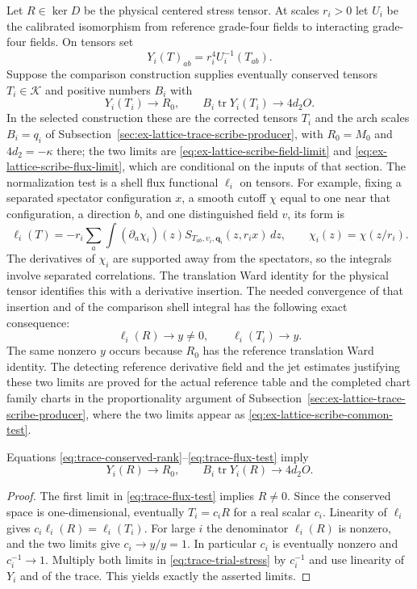 Let $R\in\ker D$ be the physical centered stress tensor. At scales
$r_i>0$ let $U_i$ be the calibrated isomorphism from reference grade-four
fields to interacting grade-four fields. On tensors set
\[
 Y_i(T)_{ab}=r_i^4U_i^{-1}(T_{ab}).
\]
Suppose the comparison construction supplies eventually conserved tensors
$T_i\in\mathcal K$ and positive numbers $B_i$ with
\begin{equation}\label{eq:trace-trial-stress}
 Y_i(T_i)\longrightarrow R_0,\qquad
 B_i\operatorname{tr}Y_i(T_i)\longrightarrow4d_2O.
\end{equation}
In the selected construction these are the corrected tensors $T_i$ and
the arch scales $B_i=q_i$ of
Subsection~\ref{sec:ex-lattice-trace-scribe-producer}, with $R_0=M_0$ and
$4d_2=-\kappa$ there; the two limits are
\eqref{eq:ex-lattice-scribe-field-limit} and
\eqref{eq:ex-lattice-scribe-flux-limit}, which are conditional on the
inputs of that section.
The normalization test is a shell flux functional $\ell_i$ on tensors.
For example, fixing a separated spectator configuration $x$, a smooth
cutoff $\chi$ equal to one near that configuration, a direction $b$, and
one distinguished field $v$, its form is
\[
 \ell_i(T)=-r_i\sum_a\int(\partial_a\chi_i)(z)
   S_{T_{ab},v_i,\boldsymbol q_i}(z,r_ix)\,dz,
 \qquad \chi_i(z)=\chi(z/r_i).
\]
The derivatives of $\chi_i$ are supported away from the spectators, so the
integrals involve separated correlations. The translation Ward identity
for the physical tensor identifies this with a derivative insertion.
The needed convergence of that insertion and of the comparison shell
integral has the following exact consequence:
\begin{equation}\label{eq:trace-flux-test}
 \ell_i(R)\longrightarrow y\neq0,
 \qquad \ell_i(T_i)\longrightarrow y.
\end{equation}
The same nonzero $y$ occurs because $R_0$ has the reference translation
Ward identity. The detecting reference derivative field and the jet estimates
justifying these two limits are proved for the actual reference table
and the completed chart family charts in the proportionality argument of
Subsection~\ref{sec:ex-lattice-trace-scribe-producer}, where the two limits
appear as \eqref{eq:ex-lattice-scribe-common-test}.

\begin{lemma}\label{lem:trace-normalized-stress}
Equations \eqref{eq:trace-conserved-rank}--\eqref{eq:trace-flux-test} imply
\[
 Y_i(R)\longrightarrow R_0,\qquad
 B_i\operatorname{tr}Y_i(R)\longrightarrow4d_2O.
\]
\end{lemma}
\begin{proof}
The first limit in \eqref{eq:trace-flux-test} implies $R\neq0$.
Since the conserved space is one-dimensional, eventually $T_i=c_iR$
for a real scalar $c_i$. Linearity of $\ell_i$ gives
$c_i\ell_i(R)=\ell_i(T_i)$. For large $i$ the denominator $\ell_i(R)$
is nonzero, and the two limits give $c_i\to y/y=1$. In particular $c_i$
is eventually nonzero and $c_i^{-1}\to1$. Multiply both limits in
\eqref{eq:trace-trial-stress} by $c_i^{-1}$ and use linearity of $Y_i$
and of the trace. This yields exactly the asserted limits.
\end{proof}

